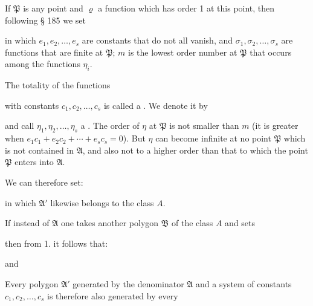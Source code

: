 
If $\mathfrak{P}$ is any point and $\varrho$ a function which has order 1 at this
point, then following § 185 we set


in which $e_1, e_2, \ldots, e_s$ are constants that do not all vanish,
and $\sigma_1, \sigma_2, \ldots, \sigma_s$ are functions that are finite at $\mathfrak{P}$;
$m$ is the lowest order number at $\mathfrak{P}$ that occurs among the functions $\eta_i$.

The totality of the functions


with constants $c_1, c_2, \ldots, c_s$ is called a . We denote it by


and call $\eta_1, \eta_2, \ldots, \eta_s$ a . The order
of $\eta$ at $\mathfrak{P}$ is not smaller than $m$ (it is greater when
$e_1c_1 + e_2c_2 + \cdots + e_sc_s = 0$). But $\eta$ can become infinite at no
point $\mathfrak{P}$ which is not contained in $\mathfrak{A}$, and
also not to a higher order than that to which the point $\mathfrak{P}$ enters into $\mathfrak{A}$.

We can therefore set:


in which $\mathfrak{A}'$ likewise belongs to the class $A$.

If instead of $\mathfrak{A}$ one takes another polygon $\mathfrak{B}$ of the class $A$
and sets


then from 1. it follows that:


and


Every polygon $\mathfrak{A}'$ generated by the denominator $\mathfrak{A}$ and a system
of constants $c_1, c_2, \ldots, c_s$ is therefore also generated by every
